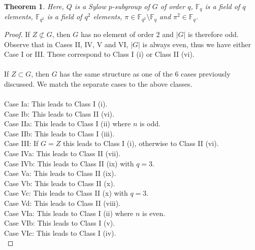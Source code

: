 \documentclass[a4paper , 11pt]{book}
\newtheorem{theorem}{Theorem}[chapter]
\theoremstyle{definition}
\theoremstyle{remark}
\begin{document}
\begin{theorem}
Here, $Q$ is a Sylow $p$-subgroup of $G$ of order $q$, $\mathbb{F}_q$ is a field of $q$ elements, $\mathbb{F}_{q^2}$ is a field of $q^2$ elements, $\pi \in \mathbb{F}_{q^2} \setminus \mathbb{F}_q$ and $\pi^2 \in \mathbb{F}_q$. \vspace{3mm}
\end{theorem}

\begin{proof}

If $Z \not \subset G$, then $G$ has no element of order 2 and $|G|$ is therefore odd. Observe that in Cases II, IV, V and VI, $|G|$ is always even, thus we have either Case I or III. These correspond to Class I (i) or Class II (vi). \\
\\
If $Z \subset G$, then $G$ has the same structure as one of the 6 cases previously discussed. We match the separate cases to the above classes. \\
\\
Case Ia: This leads to Class I (i). \\
Case Ib: This leads to Class II (vi). \\
Case IIa: This leads to Class I (ii) where $n$ is odd. \\
Case IIb: This leads to Class I (iii). \\
Case III: If $G=Z$ this leads to Class I (i), otherwise to Class II (vi). \\
Case IVa: This leads to Class II (vii). \\
Case IVb: This leads to Class II (ix) with $q=3$. \\
Case Va: This leads to Class II (ix). \\
Case Vb: This leads to Class II (x). \\
Case Vc: This leads to Class II (x) with $q=3$. \\
Case Vd: This leads to Class II (viii). \\
Case VIa: This leads to Class I (ii) where $n$ is even. \\
Case VIb: This leads to Class I (v). \\
Case VIc: This leads to Class I (iv). \\

\end{proof}
\end{document}
